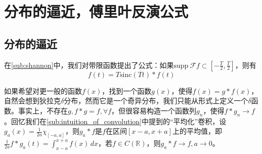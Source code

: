 \section{分布的逼近，傅里叶反演公式}\label{sec:Approach}

\subsection{分布的逼近}\label{sub:approach}
在\ref{sub:shannon}中，我们对带限函数提出了公式：如果$\text{supp}\ \mathcal{F} f\subset[-\frac{T}{2},\frac{T}{2}]$，则有
\begin{equation*}
    f(t)=T\text{sinc}(Tt)*f(t)
\end{equation*}

如果希望对更一般的函数$f(x)$，找到一个函数$g(x)$，使得$f(x)=g*f(x)$，自然会想到狄拉克$\delta$分布，然而它是一个奇异分布，我们只能从形式上定义一个$\delta$函数。事实上，不存在$g,f*g=f,\forall f$，但很容易构造一个函数列$g_n$，使得$f*g_n\to f$\cite{folland}。回忆我们在\ref{sub:intuition_of_convolution}中提到的“平均化”卷积，设$g_a(x)=\frac{1}{2a}\chi_{[-a,a]}$，则$g_a*f$是$f$在区间$[x-a,x+a]$上的平均值，即$\frac{1}{2a}f*g_a(t)=\int_{x-a}^{x+a}f(x)\,dx$，若$f\in C(\mathbb{R})$，则$g_a*f\to f,a\to 0$。

